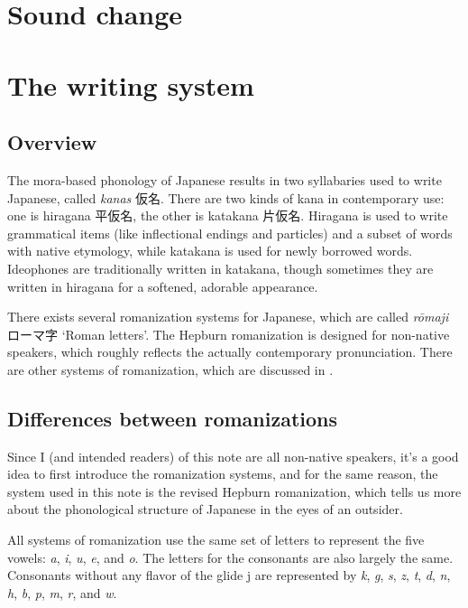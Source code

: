 \documentclass[UTF8, a4paper, oneside, scheme=plain]{ctexrep}
\newcommand*{\term}[1]{\emph{#1}}
\newcommand{\corpus}[1]{\emph{#1}}
\newcommand{\translate}[1]{`#1'}
\begin{document}
\section{Sound change}

\section{The writing system}

\subsection{Overview}

The mora-based phonology of Japanese results in two syllabaries used to write Japanese,
called \term{kanas} 仮名.
There are two kinds of kana in contemporary use:
one is hiragana 平仮名, the other is katakana 片仮名.
Hiragana is used to write grammatical items (like inflectional endings and particles)
and a subset of words with native etymology,
while katakana is used for newly borrowed words.
Ideophones are traditionally written in katakana,
though sometimes they are written in hiragana for a softened, adorable appearance.

There exists several romanization systems for Japanese,
which are called \corpus{rōmaji} ローマ字 \translate{Roman letters}.
The Hepburn romanization is designed for non-native speakers,
which roughly reflects the actually contemporary pronunciation.
There are other systems of romanization, which are discussed in .

\subsection{Differences between romanizations}\label{sec:romanization}

Since I (and intended readers) of this note are all non-native speakers,
it's a good idea to first introduce the romanization systems,
and for the same reason,
the system used in this note is the revised Hepburn romanization,
which tells us more about the phonological structure of Japanese 
in the eyes of an outsider.

All systems of romanization use the same set of letters to represent the five vowels:
\corpus{a}, \corpus{i}, \corpus{u}, \corpus{e}, and \corpus{o}.
The letters for the consonants are also largely the same.
Consonants without any flavor of the glide j are represented by 
\corpus{k}, \corpus{g}, \corpus{s}, \corpus{z}, \corpus{t}, \corpus{d}, \corpus{n}, 
\corpus{h}, \corpus{b}, \corpus{p}, \corpus{m}, \corpus{r}, and \corpus{w}.
\end{document}

